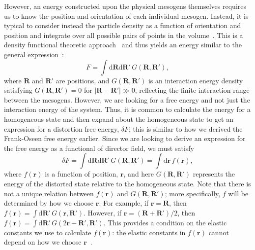However, an energy constructed upon the physical mesogens themselves requires us to know the position and orientation of each individual mesogen.
Instead, it is typical to consider instead the particle density as a function of orientation and position and integrate over all possible pairs of points in the volume~\cite{RN222}.
This is a density functional theoretic approach~\cite{RN223} and thus yields an energy similar to the general expression~\cite{RN56,RN55}:
\begin{equation}
  F = \int \textrm{d}\mathbf{R} \textrm{d}\mathbf{R}' \, G(\mathbf{R},\mathbf{R}'),
\end{equation}
where $\mathbf{R}$ and $\mathbf{R}'$ are positions, and $G(\mathbf{R},\mathbf{R}')$ is an interaction energy density satisfying $G(\mathbf{R},\mathbf{R}') = 0$ for $|\mathbf{R}-\mathbf{R}'| \gg 0$, reflecting the finite interaction range between the mesogens.
However, we are looking for a free energy and not just the interaction energy of the system.
Thus, it is common to calculate the energy for a homogeneous state and then expand about the homogeneous state to get an expression for a distortion free energy, $\delta F$; this is similar to how we derived the Frank-Oseen free energy earlier.
Since we are looking to derive an expression for the free energy as a functional of director field, we must satisfy
\begin{equation}
  \delta F = \int \textrm{d}\mathbf{R} \textrm{d}\mathbf{R}' \, G(\mathbf{R},\mathbf{R}')
  = \int \textrm{d} \mathbf{r} \, f(\mathbf{r}),\label{e:2-NonlocalLocal}
\end{equation}
where $f(\mathbf{r})$ is a function of position, $\mathbf{r}$, and here $G(\mathbf{R},\mathbf{R}')$ represents the energy of the distorted state relative to the homogeneous state.
Note that there is not a unique relation between $f(\mathbf{r})$ and $G(\mathbf{R},\mathbf{R}')$; more specifically, $f$ will be determined by how we choose $\mathbf{r}$.
For example, if $\mathbf{r} = \mathbf{R}$, then $f(\mathbf{r}) = \int \textrm{d}\mathbf{R}' \, G(\mathbf{r},\mathbf{R}')$.
However, if $\mathbf{r} = (\mathbf{R} + \mathbf{R}')/2$, then $f(\mathbf{r}) = \int \textrm{d}\mathbf{R}' \, G(2\mathbf{r} - \mathbf{R}',\mathbf{R}')$.
This provides a condition on the elastic constants we use to calculate $f(\mathbf{r})$: the elastic constants in $f(\mathbf{r})$ cannot depend on how we choose $\mathbf{r}$~\cite{RN55}.

